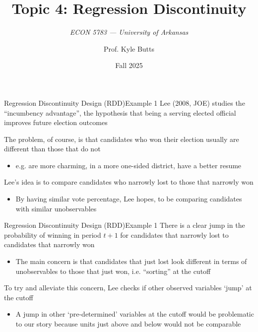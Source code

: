 \documentclass[aspectratio=169,t,11pt,table]{beamer}
\title{Topic 4: Regression Discontinuity}
\subtitle{\it  ECON 5783 — University of Arkansas}
\date{Fall 2025}
\author{Prof. Kyle Butts}
\begin{document}
\begin{frame}
\maketitle

\end{frame}

\begin{frame}{Regression Discontinuity Design (RDD)}{Example 1}
  Lee (2008, JOE) studies the ``incumbency advantage'', the hypothesis that being a serving elected official improves future election outcomes

  \pause
  \bigskip
  The problem, of course, is that candidates who won their election usually are different than those that do not 
  \begin{itemize}
    \item e.g. are more charming, in a more one-sided district, have a better resume
  \end{itemize}

  \pause
  \bigskip
  Lee's idea is to compare candidates who narrowly lost to those that narrowly won 
  \begin{itemize}
    \item By having similar vote percentage, Lee hopes, to be comparing candidates with similar unobservables
  \end{itemize}
\end{frame}


\begin{frame}{Regression Discontinuity Design (RDD)}{Example 1}
  There is a clear jump in the probability of winning in period $t+1$ for candidates that narrowly lost to candidates that narrowly won
  \begin{itemize}
    \item The main concern is that candidates that just lost look different in terms of unobservables to those that just won, i.e. ``sorting'' at the cutoff
  \end{itemize}

  \pause
  \bigskip
  To try and alleviate this concern, Lee checks if other observed variables `jump' at the cutoff 
  \begin{itemize}
    \item A jump in other `pre-determined' variables at the cutoff would be problematic to our story because units just above and below would not be comparable
  \end{itemize}
\end{frame}
\end{document}
